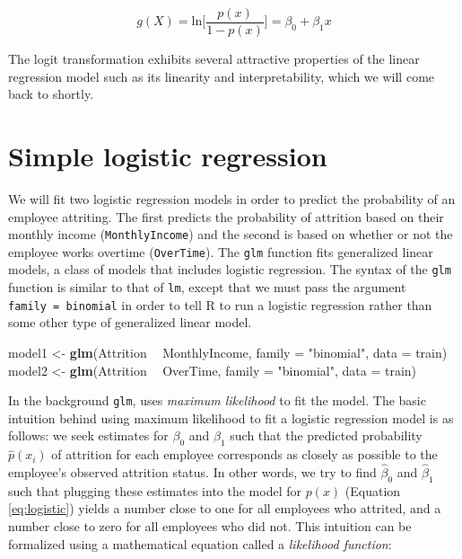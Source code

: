 \documentclass[]{book}
\newenvironment{Shaded}{\begin{snugshade}}{\end{snugshade}}
\newcommand{\DataTypeTok}[1]{\textcolor[rgb]{0.13,0.29,0.53}{#1}}
\newcommand{\KeywordTok}[1]{\textcolor[rgb]{0.13,0.29,0.53}{\textbf{#1}}}
\newcommand{\NormalTok}[1]{#1}
\newcommand{\OperatorTok}[1]{\textcolor[rgb]{0.81,0.36,0.00}{\textbf{#1}}}
\newcommand{\StringTok}[1]{\textcolor[rgb]{0.31,0.60,0.02}{#1}}
\theoremstyle{definition}
\theoremstyle{definition}
\theoremstyle{definition}
\theoremstyle{remark}
\begin{document}
\begin{equation}
\label{eq:logit}
  g(X) = \text{ln} \bigg[ \frac{p(x)}{1 - p(x)} \bigg] = \beta_0 + \beta_1x
\end{equation}

The logit transformation exhibits several attractive properties of the
linear regression model such as its linearity and interpretability,
which we will come back to shortly.

\hypertarget{simple-logistic-regression}{%
\section{Simple logistic regression}\label{simple-logistic-regression}}

We will fit two logistic regression models in order to predict the
probability of an employee attriting. The first predicts the probability
of attrition based on their monthly income (\texttt{MonthlyIncome}) and
the second is based on whether or not the employee works overtime
(\texttt{OverTime}). The \texttt{glm} function fits generalized linear
models, a class of models that includes logistic regression. The syntax
of the \texttt{glm} function is similar to that of \texttt{lm}, except
that we must pass the argument \texttt{family\ =\ binomial} in order to
tell R to run a logistic regression rather than some other type of
generalized linear model.

\begin{Shaded}
\begin{Highlighting}[]
\NormalTok{model1 <-}\StringTok{ }\KeywordTok{glm}\NormalTok{(Attrition }\OperatorTok{~}\StringTok{ }\NormalTok{MonthlyIncome, }\DataTypeTok{family =} \StringTok{"binomial"}\NormalTok{, }\DataTypeTok{data =}\NormalTok{ train)}
\NormalTok{model2 <-}\StringTok{ }\KeywordTok{glm}\NormalTok{(Attrition }\OperatorTok{~}\StringTok{ }\NormalTok{OverTime, }\DataTypeTok{family =} \StringTok{"binomial"}\NormalTok{, }\DataTypeTok{data =}\NormalTok{ train)}
\end{Highlighting}
\end{Shaded}

In the background \texttt{glm}, uses \emph{maximum likelihood} to fit
the model. The basic intuition behind using maximum likelihood to fit a
logistic regression model is as follows: we seek estimates for
\(\beta_0\) and \(\beta_1\) such that the predicted probability
\(\hat p(x_i)\) of attrition for each employee corresponds as closely as
possible to the employee's observed attrition status. In other words, we
try to find \(\hat \beta_0\) and \(\hat \beta_1\) such that plugging
these estimates into the model for \(p(x)\) (Equation \eqref{eq:logistic})
yields a number close to one for all employees who attrited, and a
number close to zero for all employees who did not. This intuition can
be formalized using a mathematical equation called a \emph{likelihood
function}:
\end{document}

